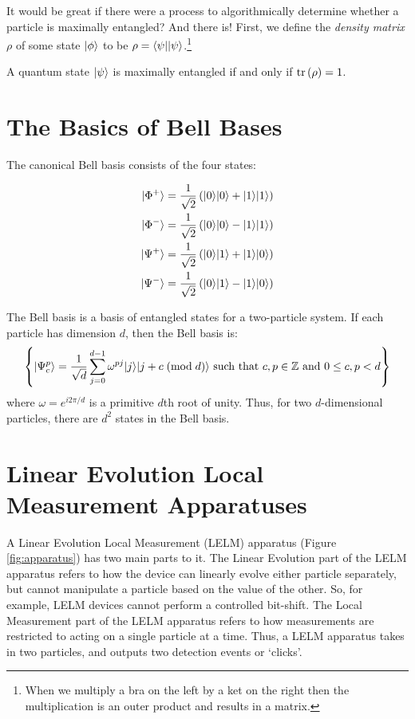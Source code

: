 It would be great if there were a process to algorithmically determine whether a particle is maximally entangled? And there is! First, we define the \textit{density matrix} $\rho$ of some state $| \phi \rangle$ to be $\rho = \langle \psi || \psi \rangle$.\footnote{When we multiply a bra on the left by a ket on the right then the multiplication is an outer product and results in a matrix.}

A quantum state $| \psi \rangle$ is maximally entangled if and only if $\text{tr}\left(\rho\right) = 1$.

\section{The Basics of Bell Bases}

The canonical Bell basis consists of the four states:

\begin{align*}
	| \Phi^+ \rangle &= \frac{1}{\sqrt{2}} \left(| 0 \rangle| 0 \rangle + | 1 \rangle| 1 \rangle\right) \\
	| \Phi^- \rangle &= \frac{1}{\sqrt{2}} \left(| 0 \rangle| 0 \rangle - | 1 \rangle| 1 \rangle\right) \\
	| \Psi^+ \rangle &= \frac{1}{\sqrt{2}} \left(| 0 \rangle| 1 \rangle + | 1 \rangle| 0 \rangle\right) \\
	| \Psi^- \rangle &= \frac{1}{\sqrt{2}} \left(| 0 \rangle| 1 \rangle - | 1 \rangle| 0 \rangle\right)
\end{align*}

The Bell basis is a basis of entangled states for a two-particle system. If each particle has dimension $d$, then the Bell basis is:
\[
\left\{ | \Psi_c^p \rangle = \frac{1}{\sqrt{d}} \sum_{j=0}^{d-1} \omega^{pj} | j \rangle| j + c \;(\text{mod}\; d) \rangle \text{ such that } c, p \in \mathbb{Z} \text{ and } 0 \leq c,p < d \right\}
\]
where $\omega = e^{i 2 \pi / d}$ is a primitive $d$th root of unity. Thus, for two $d$-dimensional particles, there are $d^2$ states in the Bell basis.

\section{Linear Evolution Local Measurement Apparatuses}

A Linear Evolution Local Measurement (LELM) apparatus (Figure \ref{fig:apparatus}) has two main parts to it. The Linear Evolution part of the LELM apparatus refers to how the device can linearly evolve either particle separately, but cannot manipulate a particle based on the value of the other. So, for example, LELM devices cannot perform a controlled bit-shift. The Local Measurement part of the LELM apparatus refers to how measurements are restricted to acting on a single particle at a time. Thus, a LELM apparatus takes in two particles, and outputs two detection events or `clicks'.

